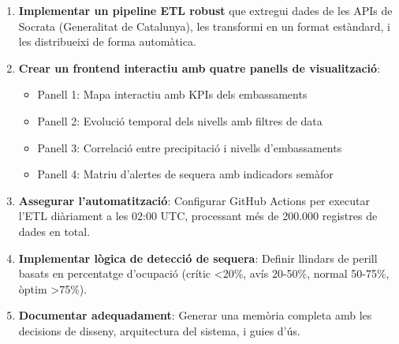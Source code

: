 \begin{enumerate}
    \item \textbf{Implementar un pipeline ETL robust} que extregui dades de les APIs de Socrata (Generalitat de Catalunya), les transformi en un format estàndard, i les distribueixi de forma automàtica.
    
    \item \textbf{Crear un frontend interactiu amb quatre panells de visualització}:
    \begin{itemize}
        \item Panell 1: Mapa interactiu amb KPIs dels embassaments
        \item Panell 2: Evolució temporal dels nivells amb filtres de data
        \item Panell 3: Correlació entre precipitació i nivells d'embassaments
        \item Panell 4: Matriu d'alertes de sequera amb indicadors semàfor
    \end{itemize}
    
    \item \textbf{Assegurar l'automatització}: Configurar GitHub Actions per executar l'ETL diàriament a les 02:00 UTC, processant més de 200.000 registres de dades en total.
    
    \item \textbf{Implementar lògica de detecció de sequera}: Definir llindars de perill basats en percentatge d'ocupació (crític <20\%, avís 20-50\%, normal 50-75\%, òptim >75\%).
    
    \item \textbf{Documentar adequadament}: Generar una memòria completa amb les decisions de disseny, arquitectura del sistema, i guies d'ús.
\end{enumerate}
